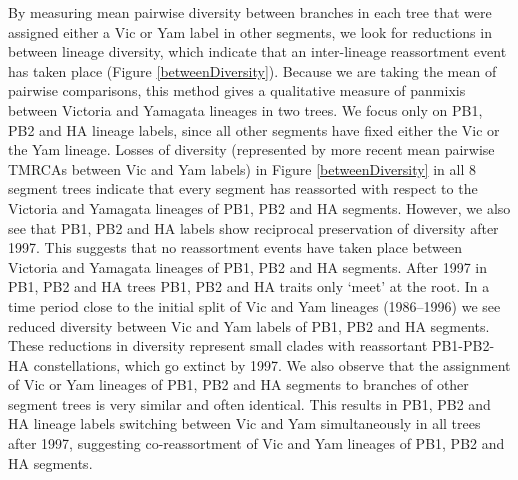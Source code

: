 \documentclass[11pt,oneside,letterpaper]{article}
\begin{document}
By measuring mean pairwise diversity between branches in each tree that were assigned either a Vic or Yam label in other segments, we look for reductions in between lineage diversity, which indicate that an inter-lineage reassortment event has taken place (Figure \ref{betweenDiversity}).
Because we are taking the mean of pairwise comparisons, this method gives a qualitative measure of panmixis between Victoria and Yamagata lineages in two trees.
We focus only on PB1, PB2 and HA lineage labels, since all other segments have fixed either the Vic or the Yam lineage.
Losses of diversity (represented by more recent mean pairwise TMRCAs between Vic and Yam labels) in Figure \ref{betweenDiversity} in all 8 segment trees indicate that every segment has reassorted with respect to the Victoria and Yamagata lineages of PB1, PB2 and HA segments.
However, we also see that PB1, PB2 and HA labels show reciprocal preservation of diversity after 1997.
This suggests that no reassortment events have taken place between Victoria and Yamagata lineages of PB1, PB2 and HA segments.
After 1997 in PB1, PB2 and HA trees PB1, PB2 and HA traits only `meet' at the root.
In a time period close to the initial split of Vic and Yam lineages (1986--1996) we see reduced diversity between Vic and Yam labels of PB1, PB2 and HA segments.
These reductions in diversity represent small clades with reassortant PB1-PB2-HA constellations, which go extinct by 1997.
We also observe that the assignment of Vic or Yam lineages of PB1, PB2 and HA segments to branches of other segment trees is very similar and often identical.
This results in PB1, PB2 and HA lineage labels switching between Vic and Yam simultaneously in all trees after 1997, suggesting co-reassortment of Vic and Yam lineages of PB1, PB2 and HA segments. 
\end{document}
